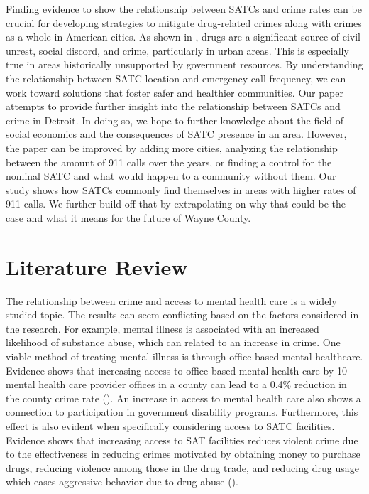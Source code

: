 \documentclass[12pt]{article}
\begin{document}
Finding evidence to show the relationship between SATCs and crime rates can be crucial for developing strategies to mitigate drug-related crimes along with crimes as a whole in American cities. As shown in \cite{SAT_centers_and_crime}, drugs are a significant source of civil unrest, social discord, and crime, particularly in urban areas. This is especially true in areas historically unsupported by government resources. By understanding the relationship between SATC location and emergency call frequency, we can work toward solutions that foster safer and healthier communities. Our paper attempts to provide further insight into the relationship between SATCs and crime in Detroit. In doing so, we hope to further knowledge about the field of social economics and the consequences of SATC presence in an area. However, the paper can be improved by adding more cities, analyzing the relationship between the amount of 911 calls over the years, or finding a control for the nominal SATC and what would happen to a community without them. Our study shows how SATCs commonly find themselves in areas with higher rates of 911 calls. We further build off that by extrapolating on why that could be the case and what it means for the future of Wayne County.



\section{Literature Review} \label{sec:literature}
The relationship between crime and access to mental health care is a widely studied topic. The results can seem conflicting based on the factors considered in the research.  For example, mental illness is associated with an increased likelihood of substance abuse, which can related to an increase in crime. One viable method of treating mental illness is through office-based mental healthcare. Evidence shows that increasing access to office-based mental health care by 10 mental health care provider offices in a county can lead to a 0.4\% reduction in the county crime rate (\cite{mental_healthcare_and_crime}). An increase in access to mental health care also shows a connection to participation in government disability programs. Furthermore, this effect is also evident when specifically considering access to SATC facilities. Evidence shows that increasing access to SAT facilities reduces violent crime due to the effectiveness in reducing crimes motivated by obtaining money to purchase drugs, reducing violence among those in the drug trade, and reducing drug usage which eases aggressive behavior due to drug abuse (\cite{SAT_centers_and_crime}). 
\end{document}
